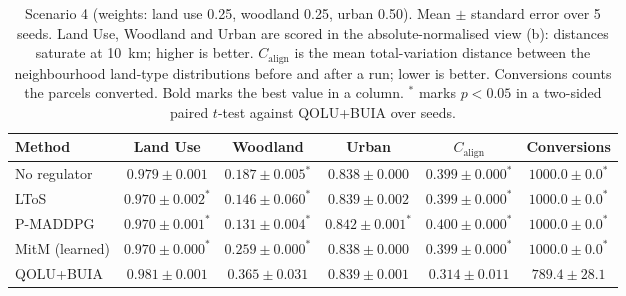 \begin{table}[htbp]
  \centering
  \caption{Scenario 4 (weights: land use 0.25, woodland 0.25, urban 0.50). Mean $\pm$ standard error over 5 seeds. Land Use, Woodland and Urban are scored in the absolute-normalised view (b): distances saturate at 10~km; higher is better. $C_{\text{align}}$ is the mean total-variation distance between the neighbourhood land-type distributions before and after a run; lower is better. Conversions counts the parcels converted. Bold marks the best value in a column. $^{*}$ marks $p < 0.05$ in a two-sided paired $t$-test against QOLU+BUIA over seeds.}
  \label{tab:p2-results-s4}
  \begin{tabular}{lccccc}
    \toprule
    Method & Land Use & Woodland & Urban & $C_{\text{align}}$ & Conversions \\
    \midrule
    No regulator & $0.979 \pm 0.001$ & $0.187 \pm 0.005^{*}$ & $0.838 \pm 0.000$ & $0.399 \pm 0.000^{*}$ & $1000.0 \pm 0.0^{*}$ \\
    LToS & $0.970 \pm 0.002^{*}$ & $0.146 \pm 0.060^{*}$ & $0.839 \pm 0.002$ & $0.399 \pm 0.000^{*}$ & $1000.0 \pm 0.0^{*}$ \\
    P-MADDPG & $0.970 \pm 0.001^{*}$ & $0.131 \pm 0.004^{*}$ & $\mathbf{0.842 \pm 0.001}^{*}$ & $0.400 \pm 0.000^{*}$ & $1000.0 \pm 0.0^{*}$ \\
    MitM (learned) & $0.970 \pm 0.000^{*}$ & $0.259 \pm 0.000^{*}$ & $0.838 \pm 0.000$ & $0.399 \pm 0.000^{*}$ & $1000.0 \pm 0.0^{*}$ \\
    QOLU+BUIA & $\mathbf{0.981 \pm 0.001}$ & $\mathbf{0.365 \pm 0.031}$ & $0.839 \pm 0.001$ & $\mathbf{0.314 \pm 0.011}$ & $789.4 \pm 28.1$ \\
    \bottomrule
  \end{tabular}
\end{table}
